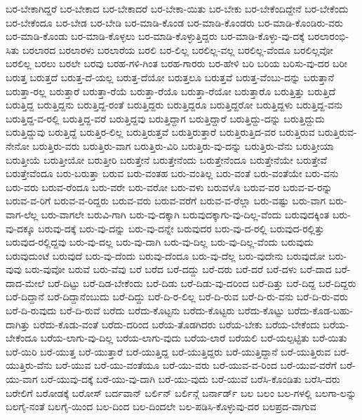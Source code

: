 {ಬರ-ಬೇಕಾಗಿದ್ದರೆ
ಬರ-ಬೇಕಾದ
ಬರ-ಬೇಕಾದರೆ
ಬರ-ಬೇಕಾ-ಯಿತು
ಬರ-ಬೇಕು
ಬರ-ಬೇಕೆಂದಿದ್ದೇನೆ
ಬರ-ಬೇಕೆಂದು
ಬರ-ಬೇಕೆಂದೂ
ಬರ-ಬೇಡ
ಬರ-ಬೇಡಿ
ಬರ-ಮಾಡಿ-ಕೊಂಡ
ಬರ-ಮಾಡಿ-ಕೊಂಡರು
ಬರ-ಮಾಡಿ-ಕೊಂಡಿರು-ವರು
ಬರ-ಮಾಡಿ-ಕೊಂಡು
ಬರ-ಮಾಡಿ-ಕೊಳ್ಳಲು
ಬರ-ಮಾಡಿ-ಕೊಳ್ಳುತ್ತಿದ್ದರು
ಬರ-ಮಾಡಿ-ಕೊಳ್ಳು-ವು-ದಕ್ಕೆ
ಬರಲಾರಂಭಿ-ಸಿತು
ಬರಲಾರದ
ಬರಲಾರಳು
ಬರಲಾರೆಯ
ಬರಲಿ
ಬರ-ಲಿಲ್ಲ
ಬರಲಿಲ್ಲ-ವಲ್ಲ
ಬರಲಿಲ್ಲ-ವೆಂದೂ
ಬರಲಿಲ್ಲವೋ
ಬರಲಿಲ್ಲ
ಬರಲು
ಬರಲೇ
ಬರವು
ಬರಹ-ಗಳಿ-ಗಿಂತ
ಬರಹ-ಗಾರರು
ಬರ-ಹೇಳಿ
ಬರಿ
ಬರಿಯ
ಬರಿಸು-ವು-ದರ
ಬರೀ
ಬರುತ್ತ
ಬರುತ್ತದೆ
ಬರುತ್ತ-ದೆ-ಯಲ್ಲ
ಬರುತ್ತ-ದೆಯೋ
ಬರುತ್ತಲೂ
ಬರುತ್ತವೆ
ಬರುತ್ತ-ವೆಂಬು-ದನ್ನು
ಬರುತ್ತಾನೆ
ಬರುತ್ತಾ-ರಲ್ಲ
ಬರುತ್ತಾರೆ
ಬರುತ್ತಾ-ರೆಯೆ
ಬರುತ್ತಾ-ರೆಯೊ
ಬರುತ್ತಾ-ರೆಯೋ
ಬರುತ್ತಾರೊ
ಬರುತ್ತಿತ್ತು
ಬರುತ್ತಿದೆ
ಬರುತ್ತಿದ್ದ
ಬರುತ್ತಿದ್ದನು
ಬರುತ್ತಿದ್ದ-ರಂತೆ
ಬರುತ್ತಿದ್ದರು
ಬರುತ್ತಿದ್ದರೂ
ಬರುತ್ತಿದ್ದರೋ
ಬರುತ್ತಿದ್ದಳು
ಬರುತ್ತಿದ್ದ-ವನು
ಬರುತ್ತಿದ್ದ-ವ-ರಲ್ಲಿ
ಬರುತ್ತಿದ್ದ-ವರೆ
ಬರುತ್ತಿದ್ದವು
ಬರುತ್ತಿದ್ದಾಗ
ಬರುತ್ತಿದ್ದಾರೆ
ಬರುತ್ತಿದ್ದು-ದನ್ನು
ಬರುತ್ತಿದ್ದುದು
ಬರುತ್ತಿದ್ದುವು
ಬರುತ್ತಿದ್ದೆ
ಬರುತ್ತಿರ-ಲಿಲ್ಲ
ಬರುತ್ತಿರುತ್ತವೆ
ಬರುತ್ತಿರುತ್ತಾರೆ
ಬರುತ್ತಿರುತ್ತಿದ-ವರ
ಬರುತ್ತಿರುವ
ಬರುತ್ತಿರುವ-ನೇನೋ
ಬರುತ್ತಿರು-ವರು
ಬರುತ್ತಿರು-ವಾಗ
ಬರುತ್ತಿರು-ವಿರಿ
ಬರುತ್ತಿರು-ವು-ದನ್ನು
ಬರುತ್ತಿರು-ವೆನು
ಬರುತ್ತೀಯಾ
ಬರುತ್ತೀಯೆ
ಬರುತ್ತೀಯೋ
ಬರುತ್ತೀರಿ
ಬರುತ್ತೇನೆ
ಬರುತ್ತೇನೆಂದು
ಬರುತ್ತೇನೆಂದೂ
ಬರುತ್ತೇನೆಯೇ
ಬರುತ್ತೇವೆ
ಬರುತ್ತೇವೆಂದೂ
ಬರು-ಬರುತ್ತಾ
ಬರುವ
ಬರು-ವಂತಹ
ಬರು-ವಂತಿಲ್ಲ
ಬರು-ವಂತೆ
ಬರು-ವಂತೆಯೇ
ಬರು-ವನು
ಬರು-ವರು
ಬರುವ-ರೆಂದೂ
ಬರು-ವರೇ
ಬರು-ವರೋ
ಬರು-ವಳು
ಬರುವಳೊ
ಬರುವ-ವರ
ಬರುವ-ವ-ರನ್ನು
ಬರುವ-ವ-ರಿಗೆ
ಬರುವ-ವ-ರಿದ್ದರು
ಬರುವ-ವರು
ಬರುವ-ವರೆಗೆ
ಬರುವ-ವ-ರೆಲ್ಲಾ
ಬರು-ವಷ್ಟು
ಬರು-ವಾಗ
ಬರು-ವಾಗ-ಲೆಲ್ಲ
ಬರು-ವಾಗಲೇ
ಬರುವಿ-ಗಾಗಿ
ಬರು-ವು-ದಕ್ಕಾಗಿ
ಬರುವುದಕ್ಕಾಗು-ವು-ದಿಲ್ಲ-ವೆಂದು
ಬರುವುದಕ್ಕಿಂತ
ಬರು-ವು-ದಕ್ಕೂ
ಬರುವು-ದಕ್ಕೆ
ಬರು-ವು-ದನ್ನು
ಬರು-ವು-ದನ್ನೇ
ಬರುವುದರ
ಬರು-ವು-ದ-ರಲ್ಲಿ
ಬರುವುದ-ರಲ್ಲಿತ್ತು
ಬರುವುದ-ರಲ್ಲಿದ್ದವು
ಬರು-ವು-ದಲ್ಲ
ಬರು-ವು-ದಾಗಿ
ಬರು-ವು-ದಿಲ್ಲ
ಬರು-ವು-ದಿಲ್ಲ-ವೆಂದು
ಬರುವುದು
ಬರುವುದುಂಟೆ
ಬರುವುದೆ
ಬರು-ವು-ದೆಂದು
ಬರುವು-ದೆಂದೂ
ಬರು-ವು-ದೆಲ್ಲ
ಬರು-ವುದೇನು
ಬರುವುದೋ
ಬರು-ವುವು
ಬರು-ವುವೋ
ಬರುವೆ
ಬರು-ವೆವು
ಬರೆ
ಬರೆದ
ಬರೆ-ದದ್ದು
ಬರೆ-ದರು
ಬರೆ-ದರೆ
ಬರೆ-ದಳು
ಬರೆ-ದಾದ
ಬರೆ-ದಾದ-ಮೇಲೆ
ಬರೆ-ದಿಟ್ಟು
ಬರೆ-ದಿಡ-ಬೇಕೆಂದು
ಬರೆ-ದಿಡು
ಬರೆ-ದಿಡು-ವು-ದರಿಂದ
ಬರೆ-ದಿತ್ತು
ಬರೆ-ದಿದ್ದ
ಬರೆ-ದಿದ್ದರು
ಬರೆ-ದಿದ್ದಾನೆ
ಬರೆ-ದಿದ್ದಾನೆಂಬುದು
ಬರೆ-ದಿದ್ದು
ಬರೆ-ದಿ-ರ-ಲಿಲ್ಲ
ಬರೆ-ದಿ-ರುವ
ಬರೆ-ದಿ-ರು-ವನು
ಬರೆ-ದಿ-ರು-ವರು
ಬರೆ-ದಿ-ರುವುದು
ಬರೆ-ದಿ-ರುವೆ
ಬರೆದು
ಬರೆದು-ಕೊಟ್ಟನು
ಬರೆದು-ಕೊಟ್ಟರು
ಬರೆದು-ಕೊಟ್ಟು
ಬರೆದು-ಕೊಡ-ಬಹು-ದಾಗಿತ್ತು
ಬರೆದು-ಕೊಡು-ವಂತೆ
ಬರೆದು-ದರಿಂದ
ಬರೆಯ-ತೊಡಗಿದರು
ಬರೆಯ-ಬೇಕು
ಬರೆಯ-ಬೇಕೆಂದು
ಬರೆಯ-ಬೇಕೆಂದೂ
ಬರೆಯ-ಲಾಗು-ವು-ದಿಲ್ಲ
ಬರೆಯ-ಲಾಗು-ವುದು
ಬರೆಯ-ಲಾರೆ
ಬರೆಯಲಿ
ಬರೆ-ಯಲ್ಪಟ್ಟಿತು
ಬರೆ-ಯಿತು
ಬರೆ-ಯಿರಿ
ಬರೆ-ಯುತ್ತ
ಬರೆ-ಯುತ್ತಾರೆ
ಬರೆ-ಯುತ್ತಿದ್ದ
ಬರೆ-ಯುತ್ತಿದ್ದರು
ಬರೆ-ಯುತ್ತಿದ್ದಾನೆ
ಬರೆ-ಯುತ್ತಿರುವ
ಬರೆ-ಯುತ್ತಿರು-ವೆನು
ಬರೆ-ಯುವ
ಬರೆ-ಯು-ವಂತೆಯೂ
ಬರೆ-ಯು-ವರು
ಬರೆ-ಯುವ-ವ-ರಿಂದ
ಬರೆ-ಯುವ-ವರೆಗೆ
ಬರೆ-ಯು-ವಾಗ
ಬರೆ-ಯುವು-ದಕ್ಕೆ
ಬರೆ-ಯು-ವು-ದಾಗಿ
ಬರೆ-ಯು-ವುದು
ಬರೆ-ಯುವೆ
ಬರೆಸಿ-ಕೊಂಡಿತು
ಬರೆಸಿ-ದರು
ಬರೇಲಿಗೆ
ಬರೋಡಕ್ಕೆ
ಬರೋಸ್
ಬರ್ದವಾನ್
ಬರ್ಲಿನ್
ಬರ್ಲಿನ್ಗೆ
ಬರ್ನಾರ್ಡ್
ಬಲ
ಬಲಂ
ಬಲ-ಗಳಲ್ಲಿ
ಬಲಗಾ-ಲನ್ನು
ಬಲಗೈ-ನಂತೆ
ಬಲಗೈ-ಯಿಂದ
ಬಲ-ದಿಂದ
ಬಲ-ದಿಂದಲೇ
ಬಲ-ಪಡಿಸಿ-ಕೊಳ್ಳುವು-ದರ
ಬಲಪ್ರದ-ವಾಗುವ
}
